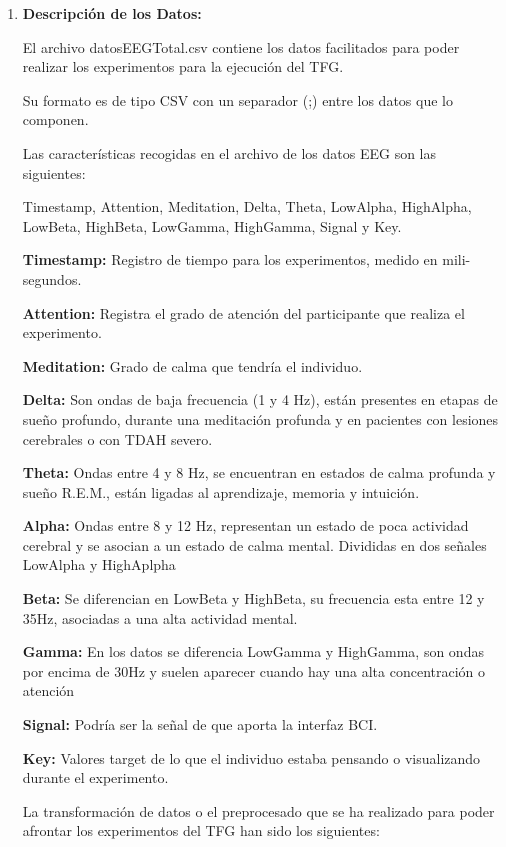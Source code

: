 \begin{enumerate}
\def\labelenumi{\arabic{enumi}.}
\tightlist
\item
\textbf{Descripción de los Datos:}

El archivo datosEEGTotal.csv contiene los datos facilitados para poder realizar los experimentos para la ejecución del TFG.

Su formato es de tipo CSV con un separador (;) entre los datos que lo componen.

Las características recogidas en el archivo de los datos EEG son las siguientes:

Timestamp, Attention, Meditation, Delta, Theta, LowAlpha, HighAlpha, LowBeta, HighBeta, LowGamma, HighGamma, Signal y Key.

\textbf{Timestamp:} Registro de tiempo para los experimentos, medido en mili-segundos.

\textbf{Attention:} Registra el grado de atención del participante que realiza el experimento.

\textbf{Meditation:} Grado de calma que tendría el individuo.

\textbf{Delta:} Son ondas de baja frecuencia (1 y 4 Hz), están presentes en etapas de sueño profundo, durante una meditación profunda y en pacientes con lesiones cerebrales o con TDAH severo.

\textbf{Theta:} Ondas entre 4 y 8 Hz, se encuentran en estados de calma profunda y sueño R.E.M., están ligadas al aprendizaje, memoria y intuición.

\textbf{Alpha:} Ondas entre 8 y 12 Hz, representan un estado de poca actividad cerebral y se asocian a un estado de calma mental. Divididas en dos señales LowAlpha y HighAplpha

\textbf{Beta:} Se diferencian en LowBeta y HighBeta, su frecuencia esta entre 12 y 35Hz, asociadas a una alta actividad mental. 

\textbf{Gamma:} En los datos se diferencia LowGamma y HighGamma, son ondas por encima de 30Hz y suelen aparecer cuando hay una alta concentración o atención

\textbf{Signal:} Podría ser la señal de que aporta la interfaz BCI.

\textbf{Key:} Valores target de lo que el individuo estaba pensando o visualizando durante el experimento.


La transformación de datos o el preprocesado que se ha realizado para poder afrontar los experimentos del TFG han sido los siguientes:



\end{enumerate}
